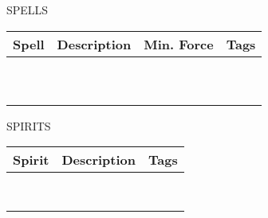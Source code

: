 \begin{dossier}

\begin{minipage}[b][9.7cm][t]{25.5cm}
\begin{dossierbox}{25.5cm}{15cm}{SPELLS}
\begin{adjustwidth*}{0cm}{.2cm}
\vspace{-.1cm}
\begin{tabu}{p{5cm}|p{9cm}|p{2cm}|p{8cm}}
\rowfont{\oswaldfont\fontsize{16pt}{0em}\selectfont}
Spell & Description & Min. Force & Tags\\
\hline& & & \\[.20cm]
\hline& & & \\[.20cm]
\hline& & & \\[.20cm]
\hline& & & \\[.20cm]
\hline& & & \\[.20cm]
\hline& & & \\[.20cm]
\hline& & & \\[.20cm]
\hline& & & \\[.20cm]
\hline& & & \\[.20cm]
\hline& & & \\[.20cm]
\hline
\end{tabu}
\end{adjustwidth*}
\end{dossierbox}
\end{minipage}
\begin{minipage}[b][][t]{25.5cm}
\begin{dossierbox}{25.5cm}{15cm}{SPIRITS}
\begin{adjustwidth*}{0cm}{.2cm}
\vspace{-.1cm}
\begin{tabu}{p{5cm}|p{9cm}|p{10cm}}
\rowfont{\oswaldfont\fontsize{16pt}{0em}\selectfont}
Spirit & Description & Tags\\
\hline& & \\[.20cm]
\hline& & \\[.20cm]
\hline& & \\[.20cm]
\hline& & \\[.20cm]
\hline& & \\[.20cm]
\hline& & \\[.20cm]
\hline& & \\[.20cm]
\hline& & \\[.20cm]
\hline
\end{tabu}
\end{adjustwidth*}
\end{dossierbox}
\end{minipage}


\end{dossier}


